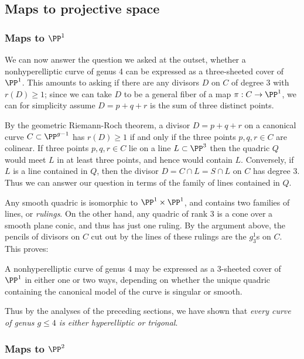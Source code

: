 \subsection{Maps to projective space}

\subsubsection{Maps to $\PP^1$}

We can now answer the question we asked at the outset, whether a nonhyperelliptic curve of genus 4 can be expressed as a three-sheeted cover of $\PP^1$. This amounts to asking if there are any divisors $D$ on $C$ of degree 3 with $r(D) \geq 1$; since we can take $D$ to be a general fiber of a map $\pi : C \to \PP^1$, we can for simplicity assume $D = p+q+r$ is the sum of three distinct points.

By the geometric Riemann-Roch theorem, a divisor $D = p+q+r$ on a canonical curve $C \subset \PP^{g-1}$ has $r(D) \geq 1$ if and only if the three points $p,q,r \in C$ are colinear. If three points $p,q,r \in C$ lie on a line $L \subset \PP^3$ then the quadric $Q$ would meet $L$ in at least three points, and hence would contain $L$. Conversely,  if $L$ is a line contained in $Q$, then the divisor $D = C \cap L = S \cap L$ on $C$ has degree  3. Thus we can answer our question in terms of the family of lines contained in $Q$.

Any smooth quadric is isomorphic to $\PP^1\times \PP^1$, and contains two families of lines, or \emph{rulings}. On the other hand, any  quadric of rank 3 is a cone over a smooth plane conic, and thus has just one ruling. By the argument above, the pencils of divisors on $C$ cut out by the lines of these rulings are the $g^1_3$s on $C$. This proves:

\begin{proposition}\label{genus 4 trigonal}
A nonhyperelliptic curve of genus 4 may be expressed as a 3-sheeted cover of $\PP^1$ in either one or two ways, depending on whether the unique quadric containing the canonical model of the curve is singular or smooth.
\end{proposition}

Thus by the analyses of the preceding sections, we have shown that \emph{every curve of genus $g \leq 4$ is either hyperelliptic or trigonal}. 

\subsubsection{Maps to $\PP^2$}

